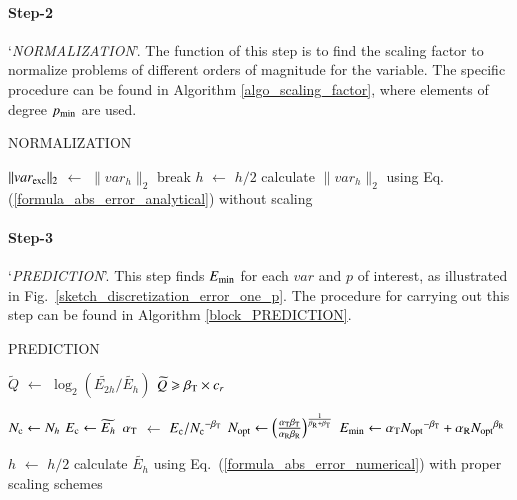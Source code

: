 \documentclass[review,3p]{elsarticle}
\begin{document}
\paragraph{Step-2} `\textit{NORMALIZATION}'. The function of this step is to find the scaling factor to normalize problems of different orders of magnitude for the variable. The specific procedure can be found in Algorithm \ref{algo_scaling_factor}, where elements of degree $p_{\rm min}$ are used. 

\vspace{0.2cm}
\begin{algorithm}[H]
\caption{NORMALIZATION}
\label{algo_scaling_factor}
{
    {
        $\|var_{\rm exc}\|_{2}$ $\gets$ $\|var_{h}\|_{2}$\;
        break\;
    }
    {
        $h$ $\gets$ $h/2$\;
        calculate $\|var_h\|_{2}$ using Eq. (\ref{formula_abs_error_analytical}) without scaling\;    
    }
}
\end{algorithm}
                                                                   
\paragraph{Step-3} `\textit{PREDICTION}'. This step finds $E_{\rm min}$ for each $var$ and $p$ of interest, as illustrated in Fig.~\ref{sketch_discretization_error_one_p}.
The procedure for carrying out this step can be found in Algorithm \ref{block_PREDICTION}.

\vspace{0.2cm}
\begin{algorithm}[H]
\caption{PREDICTION}			%
\label{block_PREDICTION}
    {
        $\widetilde{Q}$ $\gets$ $\log _2 \left( {\widetilde {E_{2h}}}/{\widetilde {E_{h}}} \right)$\;
        \eIf
        {
            $\widetilde{Q} \geqslant \beta_{\rm T} \times c_r$
        }
        {
            $N_{\rm c} \gets N_h$\;
            $E_{\rm c} \gets \widetilde {E_{h}}$\;
            $\alpha_{\rm T}$ $\gets$ ${E_{\rm c}}/{N_{\rm c}}^{- \beta_{\rm T}}$\;
            $N_{\rm opt} \gets \left( \frac{\alpha_{\rm T} \beta_{\rm T}}{\alpha _{\rm R} \beta_{\rm R}} \right)^{\frac{1}{\beta_{\rm R} + \beta_{\rm T}}}$\;
            $E_{\rm min} \gets \alpha_{\rm T} {N_{\rm opt}}^{- {\beta _{\rm T}}} + \alpha_{\rm R} {N_{\rm opt}}^{{\beta _{\rm R}}}$\;

        }
        {
            $h$ $\gets$ $h/2$\;
            calculate $\widetilde {E_{h}}$ using Eq.~(\ref{formula_abs_error_numerical}) with proper scaling schemes\;
        }
	}    
\end{algorithm}
\end{document}
